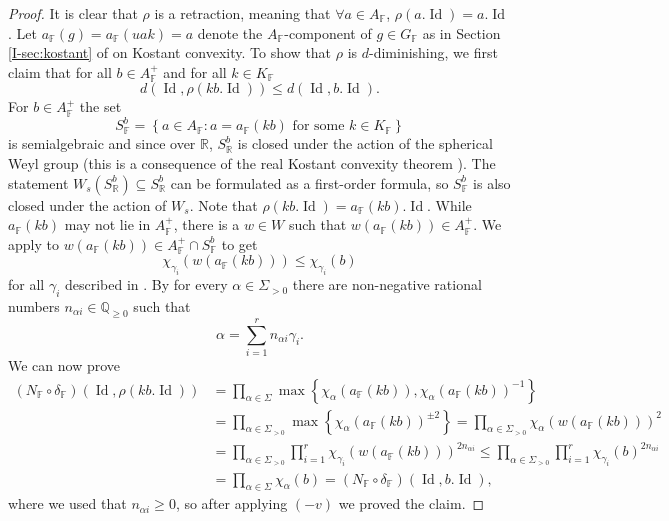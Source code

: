 \documentclass[12pt]{amsart}
\newcommand{\F}{\mathbb{F} }
\newcommand{\R}{\mathbb{R} }
\newcommand{\Q}{\mathbb{Q} }
\newcommand{\ApF}{A_\F^+}
\numberwithin{equation}{section}
\theoremstyle{remark} %
\begin{document}
\begin{proof}
	It is clear that $\rho$ is a retraction, meaning that $\forall a \in A_\F$, $\rho(a.\operatorname{Id})=a.\operatorname{Id}$. Let $a_\F(g) = a_\F(uak)=a$ denote the $A_\F$-component of $g\in G_\F$ as in Section \ref{I-sec:kostant} of \cite{AppAGRCF} on Kostant convexity. To show that $\rho$ is $d$-diminishing, we first claim that for all
	$
	b\in \ApF%
	$
	and for all $k \in K_\F$ 
	$$
	d(\operatorname{Id}, \rho(kb.\operatorname{Id})) \leq d(\operatorname{Id}, b.\operatorname{Id}).
	$$
	For $b\in \ApF$ the set
	$$
	S_\F^b= \left\{ a\in A_\F \colon a = a_{\F}(kb) \text{ for some } k \in K_\F \right\}
	$$
	is semialgebraic and since over $\R$, $S_\R^b$ is closed under the action of the spherical Weyl group (this is a consequence of the real Kostant convexity theorem \cite[Theorem 4.1]{Kos}). The statement $W_s(S_\R^b) \subseteq S_\R^b$ can be formulated as a first-order formula, so $S_\F^b$ is also closed under the action of $W_s$. Note that $\rho(kb.\operatorname{Id}) = a_\F(kb).\operatorname{Id}$. While $a_\F(kb)$ may not lie in $\ApF$, there is a $w\in W$ such that $w(a_\F(kb)) \in \ApF$. We apply \cite[Theorem \ref{I-thm:kostant_F}]{AppAGRCF} to $w(a_\F(kb)) \in \ApF \cap S_\F^b$ to get 
	$$
	\chi_{\gamma_i} (w(a_\F(kb))) \leq \chi_{\gamma_i}(b)
	$$
	for all $\gamma_i$ described in \cite[Section \ref{I-sec:kostant}]{AppAGRCF}. By \cite[Lemma \ref{I-lem:kostant_gammaalpha}]{AppAGRCF} for every $\alpha \in \Sigma_{>0}$ there are non-negative rational numbers $n_{\alpha i} \in \Q_{\geq 0}$ such that
	$$
	\alpha = \sum_{i=1}^r n_{\alpha i}\gamma_i.
	$$
	We can now prove
	\begin{align*}
		(N_\F  \circ \delta_\F)(\operatorname{Id}, \rho(kb.\operatorname{Id})) 
		&=  \prod_{\alpha \in \Sigma} \max \left\{ \chi_\alpha (a_\F(kb)), \chi_\alpha (a_\F(kb))^{-1}\right\} \\
		&=  \prod_{\alpha \in \Sigma_{>0}} \max \left\{ \chi_\alpha (a_\F(kb))^{\pm 2} \right\}  
		=  \prod_{\alpha \in \Sigma_{>0}}  \chi_\alpha (w(a_\F(kb)))^2  \\
		&=  \prod_{\alpha \in \Sigma_{>0}} \prod_{i=1}^r  \chi_{ \gamma_i } (w(a_\F(kb)))^{2n_{\alpha i}} 
		\leq \prod_{\alpha \in \Sigma_{>0}} \prod_{i=1}^r \chi_{\gamma_i} (b)^{2n_{\alpha i}} \\
		&= \prod_{\alpha \in \Sigma}  \chi_{\alpha}(b) = (N_\F \circ \delta_\F)(\operatorname{Id},b.\operatorname{Id}),
	\end{align*}
	where we used that $n_{\alpha i}\geq 0$, so after applying $(-v)$ we proved the claim.
	

\end{proof}
\end{document}
